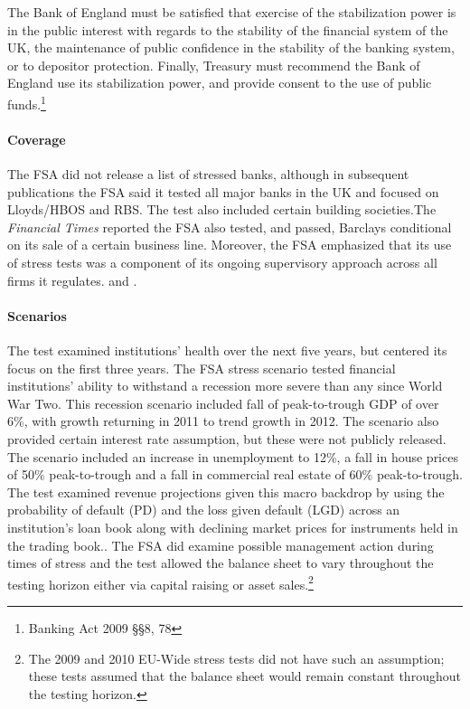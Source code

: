 \documentclass[12pt]{article}
\begin{document}
The Bank of England must be satisfied that exercise of the stabilization power is in the public interest with regards to the stability of the financial system of the UK, the maintenance of public confidence in the stability of the banking system, or to depositor protection. Finally, Treasury must recommend the Bank of England use its stabilization power, and provide consent to the use of public funds.\footnote{Banking Act 2009 \S \S 8, 78} 

\paragraph{Coverage} 

The FSA did not release a list of stressed banks, although in subsequent publications the FSA said it tested all major banks in the UK and focused on Lloyds/HBOS and RBS. The test also included certain building societies.The \textit{Financial Times} reported the FSA also tested, and passed, Barclays conditional on its sale of a certain business line. Moreover, the FSA emphasized that its use of stress tests was a component of its ongoing supervisory approach across all firms it regulates. \citep{Results} and \citep{Barclays1}.

\paragraph{Scenarios} The test examined institutions' health over the next five years, but centered its focus on the first three years. The FSA stress scenario tested financial institutions' ability to withstand a recession more severe than any since World War Two. This recession scenario included fall of peak-to-trough GDP of over 6\%, with growth returning in 2011 to trend growth in 2012. The scenario also provided certain interest rate assumption, but these were not publicly released. The scenario included an increase in unemployment to 12\%, a fall in house prices of 50\% peak-to-trough and a fall in commercial real estate of 60\% peak-to-trough. The test examined revenue projections given this macro backdrop by using the probability of default (PD) and the loss given default (LGD) across an institution's loan book along with declining market prices for instruments held in the trading book.\citep{Results}. The FSA did examine possible management action during times of stress and the test allowed the balance sheet to vary throughout the testing horizon either via capital raising or asset sales.\footnote{The 2009 and 2010 EU-Wide stress tests did not have such an assumption; these tests assumed that the balance sheet would remain constant throughout the testing horizon.} 
\end{document}
